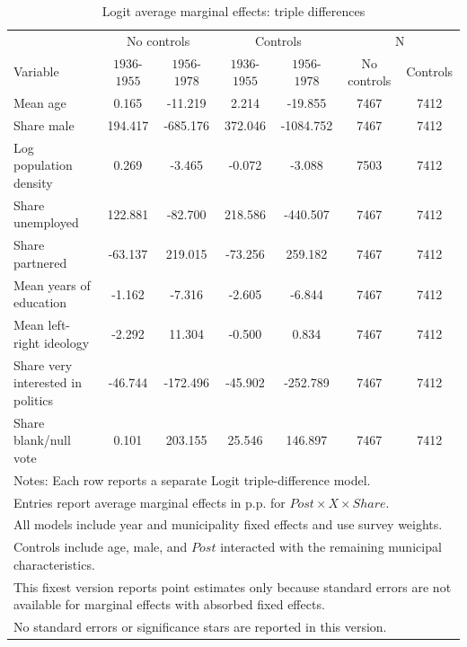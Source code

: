 \begin{table}[!htbp]
\centering
\caption{Logit average marginal effects: triple differences}
\label{tab:logit_triple_mfx}
\small
\begin{tabular}{lcccccc}
\hline
 & \multicolumn{2}{c}{No controls} & \multicolumn{2}{c}{Controls} & \multicolumn{2}{c}{N} \\
Variable & $1936$-$1955$ & $1956$-$1978$ & $1936$-$1955$ & $1956$-$1978$ & No controls & Controls \\
\hline
Mean age & 0.165 & -11.219 & 2.214 & -19.855 & 7467 & 7412 \\
Share male & 194.417 & -685.176 & 372.046 & -1084.752 & 7467 & 7412 \\
Log population density & 0.269 & -3.465 & -0.072 & -3.088 & 7503 & 7412 \\
Share unemployed & 122.881 & -82.700 & 218.586 & -440.507 & 7467 & 7412 \\
Share partnered & -63.137 & 219.015 & -73.256 & 259.182 & 7467 & 7412 \\
Mean years of education & -1.162 & -7.316 & -2.605 & -6.844 & 7467 & 7412 \\
Mean left-right ideology & -2.292 & 11.304 & -0.500 & 0.834 & 7467 & 7412 \\
Share very interested in politics & -46.744 & -172.496 & -45.902 & -252.789 & 7467 & 7412 \\
Share blank/null vote & 0.101 & 203.155 & 25.546 & 146.897 & 7467 & 7412 \\
\hline
\multicolumn{7}{l}{\footnotesize Notes: Each row reports a separate Logit triple-difference model.} \\
\multicolumn{7}{l}{\footnotesize Entries report average marginal effects in p.p. for $Post \times X \times Share$.} \\
\multicolumn{7}{l}{\footnotesize All models include year and municipality fixed effects and use survey weights.} \\
\multicolumn{7}{l}{\footnotesize Controls include age, male, and $Post$ interacted with the remaining municipal characteristics.} \\
\multicolumn{7}{l}{\footnotesize This fixest version reports point estimates only because standard errors are not available for marginal effects with absorbed fixed effects.} \\
\multicolumn{7}{l}{\footnotesize No standard errors or significance stars are reported in this version.} \\
\end{tabular}
\end{table}
